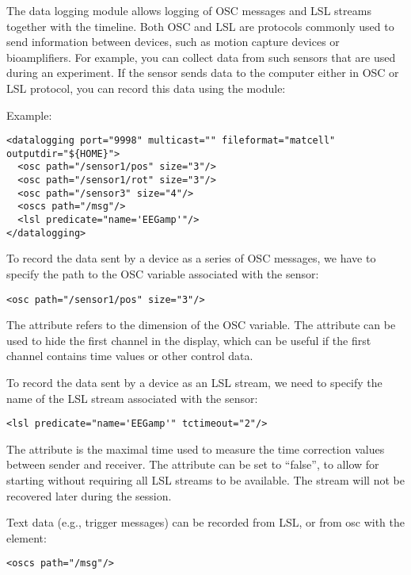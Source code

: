 The data logging module allows logging of OSC messages and LSL streams
together with the \tascar{} timeline.
%
Both OSC and LSL are protocols commonly used to send information
between devices, such as motion capture devices or bioamplifiers.
%
For example, you can collect data from such sensors that are used
during an experiment.
%
If the sensor sends data to the computer either in OSC or LSL
protocol, you can record this data using the 
module:

Example:
\begin{lstlisting}[numbers=none]
<datalogging port="9998" multicast="" fileformat="matcell" outputdir="${HOME}">
  <osc path="/sensor1/pos" size="3"/>
  <osc path="/sensor1/rot" size="3"/>
  <osc path="/sensor3" size="4"/>
  <oscs path="/msg"/>
  <lsl predicate="name='EEGamp'"/>
</datalogging>
\end{lstlisting}

To record the data sent by a device as a series of OSC messages, we
have to specify the path to the OSC variable associated with the
sensor:
%
\begin{lstlisting}[numbers=none]
  <osc path="/sensor1/pos" size="3"/>
\end{lstlisting}
%
The  attribute refers to the dimension of the OSC variable.
%
The attribute  can be used to hide the first channel
in the display, which can be useful if the first channel contains time
values or other control data.

To record the data sent by a device as an LSL stream, we need to
specify the name of the LSL stream associated with the sensor:
\begin{lstlisting}[numbers=none]
  <lsl predicate="name='EEGamp'" tctimeout="2"/>
\end{lstlisting}
The attribute  is the maximal time used to measure the
time correction values between sender and receiver. The
attribute  can be set to ``false'', to allow for
starting \tascar{} without requiring all LSL streams to be
available. The stream will not be recovered later during the session.

Text data (e.g., trigger messages) can be recorded from LSL, or from osc with the  element:
\begin{lstlisting}[numbers=none]
  <oscs path="/msg"/>
\end{lstlisting}


